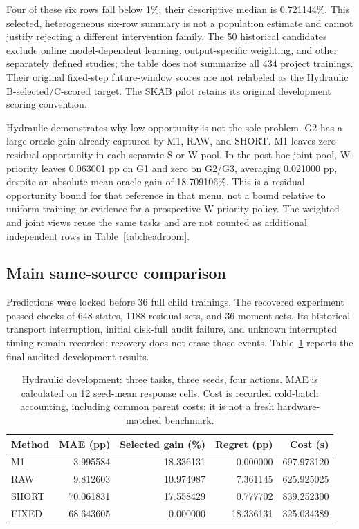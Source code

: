 \documentclass[11pt]{article}
\begin{document}
Four of these six rows fall below 1\%; their descriptive median is 0.721144\%. This selected, heterogeneous six-row summary is not a population estimate and cannot justify rejecting a different intervention family. The 50 historical candidates exclude online model-dependent learning, output-specific weighting, and other separately defined studies; the table does not summarize all 434 project trainings. Their original fixed-step future-window scores are not relabeled as the Hydraulic B-selected/C-scored target. The SKAB pilot retains its original development scoring convention.

Hydraulic demonstrates why low opportunity is not the sole problem. G2 has a large oracle gain already captured by M1, RAW, and SHORT. M1 leaves zero residual opportunity in each separate S or W pool. In the post-hoc joint pool, W-priority leaves 0.063001 pp on G1 and zero on G2/G3, averaging 0.021000 pp, despite an absolute mean oracle gain of 18.709106\%. This is a residual opportunity bound for that reference in that menu, not a bound relative to uniform training or evidence for a prospective W-priority policy. The weighted and joint views reuse the same tasks and are not counted as additional independent rows in Table~\ref{tab:headroom}.

\subsection{Main same-source comparison}
Predictions were locked before 36 full child trainings. The recovered experiment passed checks of 648 states, 1188 residual sets, and 36 moment sets. Its historical transport interruption, initial disk-full audit failure, and unknown interrupted timing remain recorded; recovery does not erase those events. Table~\ref{tab:main} reports the final audited development results.

\begin{table}[ht]
\centering\small
\caption{Hydraulic development: three tasks, three seeds, four actions. MAE is calculated on 12 seed-mean response cells. Cost is recorded cold-batch accounting, including common parent costs; it is not a fresh hardware-matched benchmark.}
\label{tab:main}
\begin{tabular}{lrrrr}\toprule
Method & MAE (pp) & Selected gain (\%) & Regret (pp) & Cost (s)\\\midrule
M1 & 3.995584 & 18.336131 & 0.000000 & 697.973120\\
RAW & 9.812603 & 10.974987 & 7.361145 & 625.925025\\
SHORT & 70.061831 & 17.558429 & 0.777702 & 839.252300\\
FIXED & 68.643605 & 0.000000 & 18.336131 & 325.034389\\\bottomrule
\end{tabular}
\end{table}
\end{document}
